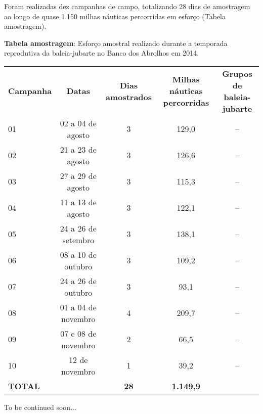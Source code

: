 

Foram realizadas dez campanhas de campo, totalizando 28 dias de amostragem ao longo de quase 1.150 milhas náuticas percorridas em esforço (Tabela amostragem).

\textbf{Tabela amostragem}: Esforço amostral realizado durante a temporada reprodutiva da baleia-jubarte no Banco dos Abrolhos em 2014.

\begin{tabular}{lcccc}
  \textbf{Campanha}        & \textbf{Datas} & \textbf{Dias amostrados}  & \textbf{Milhas náuticas percorridas} &  \textbf{Grupos de baleia-jubarte} \\   
    01   & 02 a 04 de agosto   & 3   & 129,0   & --   \\            
    02   & 21 a 23 de agosto   & 3   & 126,6   & -- \\
    03   & 27 a 29 de agosto  &  3   & 115,3   & -- \\
    04   & 11 a 13 de agosto  & 3   & 122,1   &  --  \\
    05   & 24 a 26 de setembro  & 3   & 138,1   &  --  \\    
    06   & 08 a 10 de outubro  & 3   & 109,2   &  --  \\
    07   & 24 a 26 de outubro  & 3   & 93,1   &  --  \\
    08   & 01 a 04 de novembro  & 4   & 209,7   &  --  \\
    09   & 07 e 08 de novembro  & 2   & 66,5   &  --  \\
    10   & 12 de novembro  & 1   & 39,2   &  -- \\
    \textbf{TOTAL}   &   & \textbf{28}  & \textbf{1.149,9} &  \\ 
    
  \end{tabular}
  
  To be continued soon...